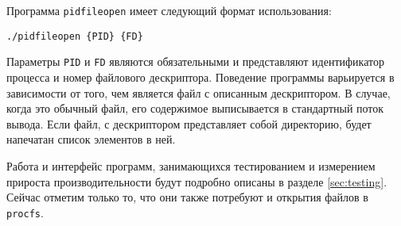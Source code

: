 Программа \texttt{pidfileopen} имеет следующий формат использования:

\medskip
\begin{lstlisting}[style=cstyle]
./pidfileopen {PID} {FD}
\end{lstlisting}
\medskip

Параметры \texttt{PID} и \texttt{FD} являются обязательными и представляют
идентификатор процесса и номер файлового дескриптора. Поведение программы
варьируется в зависимости от того, чем является файл с описанным дескриптором. В
случае, когда это обычный файл, его содержимое выписывается в стандартный поток
вывода. Если файл, с дескриптором представляет собой директорию, будет напечатан
список элементов в ней.

Работа и интерфейс программ, занимающихся тестированием и измерением прироста
производительности будут подробно описаны в разделе \ref{sec:testing}. Сейчас
отметим только то, что они также потребуют и открытия файлов в \texttt{procfs}.

